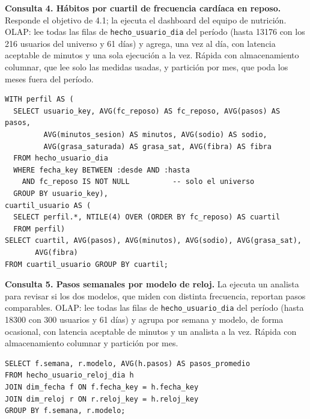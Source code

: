 \documentclass[11pt]{article}
\begin{document}
\par\noindent\begin{minipage}{\linewidth}\setlength{\parskip}{1ex}
\textbf{Consulta 4. Hábitos por cuartil de frecuencia cardíaca en reposo.}
Responde el objetivo de 4.1; la ejecuta el dashboard del equipo de nutrición.
OLAP: lee todas las filas de \texttt{hecho\_usuario\_dia} del período (hasta 13176 con los 216 usuarios del universo y 61 días) y agrega, una vez al día, con latencia aceptable de minutos y una sola ejecución a la vez. Rápida con almacenamiento columnar, que lee solo las medidas usadas,
y partición por mes, que poda los meses fuera del período.
\begin{lstlisting}
WITH perfil AS (
  SELECT usuario_key, AVG(fc_reposo) AS fc_reposo, AVG(pasos) AS pasos,
         AVG(minutos_sesion) AS minutos, AVG(sodio) AS sodio,
         AVG(grasa_saturada) AS grasa_sat, AVG(fibra) AS fibra
  FROM hecho_usuario_dia
  WHERE fecha_key BETWEEN :desde AND :hasta
    AND fc_reposo IS NOT NULL          -- solo el universo
  GROUP BY usuario_key),
cuartil_usuario AS (
  SELECT perfil.*, NTILE(4) OVER (ORDER BY fc_reposo) AS cuartil
  FROM perfil)
SELECT cuartil, AVG(pasos), AVG(minutos), AVG(sodio), AVG(grasa_sat),
       AVG(fibra)
FROM cuartil_usuario GROUP BY cuartil;
\end{lstlisting}\end{minipage}\par\medskip

\par\noindent\begin{minipage}{\linewidth}\setlength{\parskip}{1ex}
\textbf{Consulta 5. Pasos semanales por modelo de reloj.} La ejecuta un
analista para revisar si los dos modelos, que miden con distinta frecuencia,
reportan pasos comparables. OLAP: lee todas las filas de \texttt{hecho\_usuario\_dia} del período (hasta 18300 con 300 usuarios y 61 días) y agrupa por semana y modelo, de forma ocasional, con latencia aceptable de minutos y un analista a la vez. Rápida con almacenamiento columnar y partición por
mes.
\begin{lstlisting}
SELECT f.semana, r.modelo, AVG(h.pasos) AS pasos_promedio
FROM hecho_usuario_reloj_dia h
JOIN dim_fecha f ON f.fecha_key = h.fecha_key
JOIN dim_reloj r ON r.reloj_key = h.reloj_key
GROUP BY f.semana, r.modelo;
\end{lstlisting}\end{minipage}\par\medskip
\end{document}
